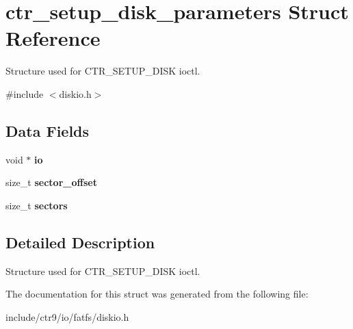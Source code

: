 \hypertarget{structctr__setup__disk__parameters}{}\section{ctr\+\_\+setup\+\_\+disk\+\_\+parameters Struct Reference}
\label{structctr__setup__disk__parameters}


Structure used for C\+T\+R\+\_\+\+S\+E\+T\+U\+P\+\_\+\+D\+I\+SK ioctl.  




{\ttfamily \#include $<$diskio.\+h$>$}

\subsection*{Data Fields}
\begin{DoxyCompactItemize}
\item 
void $\ast$ {\bfseries io}\hypertarget{structctr__setup__disk__parameters_a46d2b19180d3252be9b81269ce729f14}{}\label{structctr__setup__disk__parameters_a46d2b19180d3252be9b81269ce729f14}

\item 
size\+\_\+t {\bfseries sector\+\_\+offset}\hypertarget{structctr__setup__disk__parameters_aaae976b9376b41e2dd4e4d9c205c238b}{}\label{structctr__setup__disk__parameters_aaae976b9376b41e2dd4e4d9c205c238b}

\item 
size\+\_\+t {\bfseries sectors}\hypertarget{structctr__setup__disk__parameters_abfd77d52016dab4ea8f0404c82c5d810}{}\label{structctr__setup__disk__parameters_abfd77d52016dab4ea8f0404c82c5d810}

\end{DoxyCompactItemize}


\subsection{Detailed Description}
Structure used for C\+T\+R\+\_\+\+S\+E\+T\+U\+P\+\_\+\+D\+I\+SK ioctl. 

The documentation for this struct was generated from the following file\+:\begin{DoxyCompactItemize}
\item 
include/ctr9/io/fatfs/diskio.\+h\end{DoxyCompactItemize}
